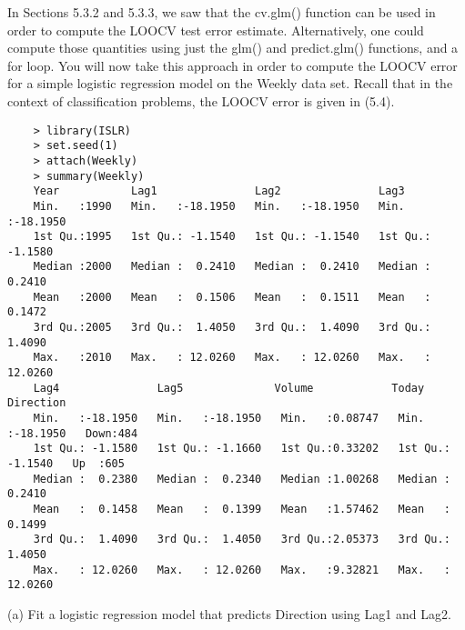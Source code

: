 \documentclass{article}
\begin{document}
In Sections 5.3.2 and 5.3.3, we saw that the cv.glm() function can be used in order to compute the LOOCV test error estimate. Alternatively, one could compute those quantities using just the glm() and predict.glm() functions, and a for loop. You will now take this approach in order to compute the LOOCV error for a simple logistic regression model on the Weekly data set. Recall that in the context of classification problems, the LOOCV error is given in (5.4).\\
\begin{program}
	\begin{verbatim}
	> library(ISLR)
	> set.seed(1)
	> attach(Weekly)
	> summary(Weekly)
	Year           Lag1               Lag2               Lag3         
	Min.   :1990   Min.   :-18.1950   Min.   :-18.1950   Min.   :-18.1950  
	1st Qu.:1995   1st Qu.: -1.1540   1st Qu.: -1.1540   1st Qu.: -1.1580  
	Median :2000   Median :  0.2410   Median :  0.2410   Median :  0.2410  
	Mean   :2000   Mean   :  0.1506   Mean   :  0.1511   Mean   :  0.1472  
	3rd Qu.:2005   3rd Qu.:  1.4050   3rd Qu.:  1.4090   3rd Qu.:  1.4090  
	Max.   :2010   Max.   : 12.0260   Max.   : 12.0260   Max.   : 12.0260  
	Lag4               Lag5              Volume            Today          Direction 
	Min.   :-18.1950   Min.   :-18.1950   Min.   :0.08747   Min.   :-18.1950   Down:484  
	1st Qu.: -1.1580   1st Qu.: -1.1660   1st Qu.:0.33202   1st Qu.: -1.1540   Up  :605  
	Median :  0.2380   Median :  0.2340   Median :1.00268   Median :  0.2410             
	Mean   :  0.1458   Mean   :  0.1399   Mean   :1.57462   Mean   :  0.1499             
	3rd Qu.:  1.4090   3rd Qu.:  1.4050   3rd Qu.:2.05373   3rd Qu.:  1.4050             
	Max.   : 12.0260   Max.   : 12.0260   Max.   :9.32821   Max.   : 12.0260             
	\end{verbatim}
\end{program}

\newpage

(a) Fit a logistic regression model that predicts Direction using Lag1 and Lag2.
\end{document}
